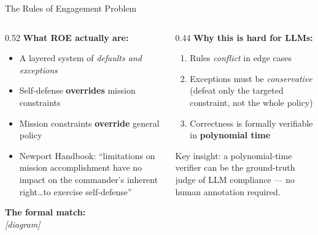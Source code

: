 \documentclass[aspectratio=169, 10pt]{beamer}
\begin{document}
\begin{frame}{The Rules of Engagement Problem}

  \begin{columns}[T]
    \begin{column}{0.52\textwidth}
      \textbf{What ROE actually are:}
      \begin{itemize}[leftmargin=1.2em]
        \item A layered system of \emph{defaults and exceptions}
        \item Self-defense \textbf{overrides} mission constraints
        \item Mission constraints \textbf{override} general policy
        \item Newport Handbook: ``limitations on mission
              accomplishment have no impact on the commander's
              inherent right\ldots{}to exercise self-defense''
      \end{itemize}

      \vspace{0.6em}
      \textbf{The formal match:}\\[0.3em]
      \textit{[diagram]}
    \end{column}

    \begin{column}{0.44\textwidth}
      \textbf{Why this is hard for LLMs:}
      \vspace{0.3em}
      \begin{enumerate}[leftmargin=1.4em, label=\arabic*.]
        \item Rules \emph{conflict} in edge cases
        \item Exceptions must be \emph{conservative} (defeat only the
              targeted constraint, not the whole policy)
        \item Correctness is formally verifiable in \textbf{polynomial time}
      \end{enumerate}

      \vspace{0.7em}
      \alert{Key insight:} a polynomial-time verifier can be the
      ground-truth judge of LLM compliance --- no human annotation
      required.
    \end{column}
  \end{columns}
\end{frame}
\end{document}
